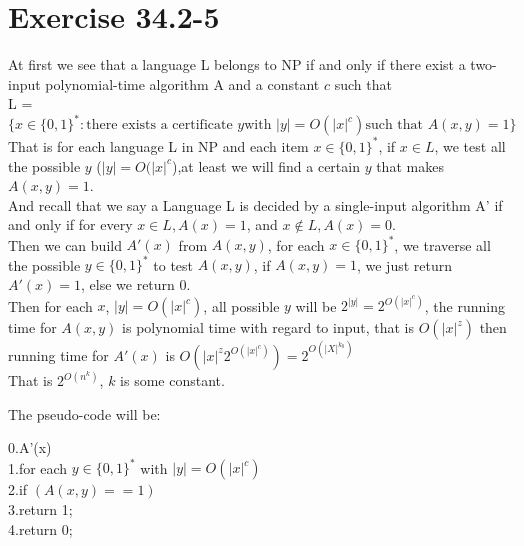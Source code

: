 \documentclass[oneside]{homework} %
\begin{document}
\maketitle
\newpage
\section*{Exercise 34.2-5}

At first we see that a language L belongs to NP if and only if there exist a two-input polynomial-time algorithm A and a constant $c$ such that \\
L = $\{ x \in \{0,1\}^{*} : \text{there exists a certificate } y \text{with } |y| = O(|x|^{c}) \text{such that } A(x,y) = 1\}$\\

That is for each language L in NP and each item $x \in \{0,1\}^{*}$, if $ x \in L$, we test all the possible $y$ ($|y| = O(|x|^{c}$),at least we will find a certain $y$ that makes $A(x,y) = 1$. \\

And recall that we say a Language L is decided by a single-input algorithm A' if and only if for every $x \in L, A(x) = 1$, and $x \notin L, A(x) = 0$. \\

Then we can build $A'(x)$ from $A(x,y)$, for each $x \in \{0,1\}^{*}$, we traverse all the possible $y \in \{0,1\}^{*}$ to test $A(x,y)$, if $A(x,y) = 1$, we just return $A'(x) = 1$, else we return 0.\\

Then for each $x$, $|y| = O(|x|^{c})$, all possible $y$ will be $2^{|y|} = 2^{O(|x|^{c})}$, the running time for $A(x,y)$ is polynomial time with regard to input, that is $O(|x|^{z})$ then running time for $A'(x)$ is $O(|x|^{z}2^{O(|x|^{c})}) = 2^{O(|X|^{k_{0}})}$\\

That is $2^{O(n^{k})}$, $k$ is some constant.

The pseudo-code will be:

0.A'(x)\\
1.for each $y \in \{0, 1\}^{*}$ with $|y| = O(|x|^{c})$\\
2.\quad if $(A(x, y) == 1)$ \\
3.\qquad return 1; \\
4.\quad return 0;
\end{document}
